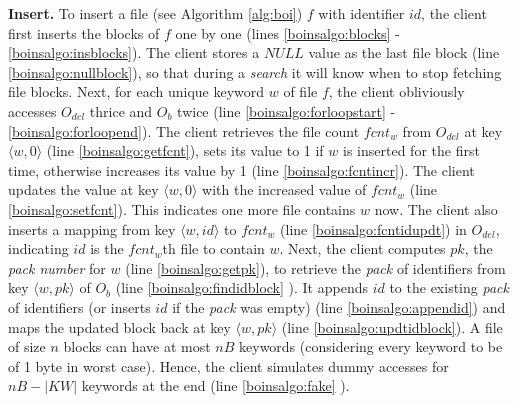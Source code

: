 \documentclass[sigconf]{acmart}
\newcommand{\pair}[2]{{\langle \ensuremath{#1, #2} \rangle}}
\newcommand{\vol}[1]{\lvert{#1}\rvert}
\begin{document}
\noindent\textbf{Insert.} To insert a file (see Algorithm \ref{alg:boi}) $f$ with identifier $id$, the client first inserts the blocks of $f$ one by one (lines \ref{boinsalgo:blocks} - \ref{boinsalgo:insblocks}). The client stores a $NULL$ value as the last file block (line \ref{boinsalgo:nullblock}), so that during a \emph{search} it will know when to stop fetching file blocks. Next, for each unique keyword $w$ of file $f$, the client obliviously accesses $O_{del}$ thrice and $O_{b}$ twice (line \ref{boinsalgo:forloopstart} - \ref{boinsalgo:forloopend}). The client retrieves the file count $fcnt_w$ from $O_{del}$ at key $\pair{w}{0}$ (line \ref{boinsalgo:getfcnt}), sets its value to 1 if $w$ is inserted for the first time, otherwise increases its value by 1 (line \ref{boinsalgo:fcntincr}). The client updates the value at key $\pair{w}{0}$ with the increased value of $fcnt_w$ (line \ref{boinsalgo:setfcnt}). This indicates one more file contains $w$ now. The client also inserts a mapping from key $\pair{w}{id}$ to $fcnt_w$ (line \ref{boinsalgo:fcntidupdt}) in $O_{del}$, indicating $id$ is the $fcnt_w$th file to contain $w$. Next, the client computes $pk$, the \emph{pack number} for $w$ (line \ref{boinsalgo:getpk}), to retrieve the \emph{pack} of identifiers from key $\pair{w}{pk}$ of $O_{b}$ (line \ref{boinsalgo:findidblock} ). It appends $id$ to the existing \emph{pack} of identifiers (or inserts $id$ if the \emph{pack} was empty) (line \ref{boinsalgo:appendid}) and maps the updated block back at key $\pair{w}{pk}$ (line \ref{boinsalgo:updtidblock}). A file of size $n$ blocks can have at most $nB$ keywords (considering every keyword to be of 1 byte in worst case). Hence, the client simulates dummy accesses for $nB-\vol{KW}$ keywords at the end (line \ref{boinsalgo:fake} ). 
\end{document}
